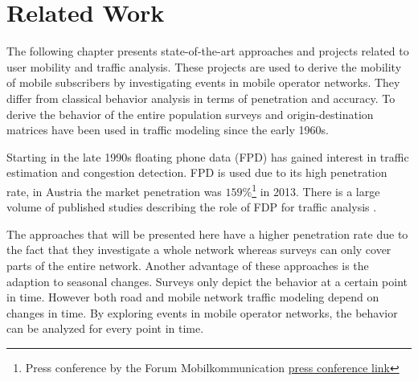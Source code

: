 \chapter{Related Work}
The following chapter presents state-of-the-art approaches and projects related to user mobility and traffic analysis. These projects are used to derive the mobility of mobile subscribers by investigating events in mobile operator networks. They differ from classical behavior analysis in terms of penetration and accuracy. To derive the behavior of the entire population surveys and origin-destination matrices have been used in traffic modeling since the early 1960s.

Starting in the late 1990s floating phone data (FPD) has gained interest in traffic estimation and congestion detection. FPD is used due to its high penetration rate, in Austria the market penetration was $159\%$\footnote{Press conference by the Forum Mobilkommunication \href{http://www.fmk.at/Medien/Pressekonferenzen/FMK-Jahrespressekonferenz-2012}{press conference link}} in 2013. There is a large volume of published studies describing the role of FDP for traffic analysis \cite{Yim2001,Qiu2007,Caceres2008}.

The approaches that will be presented here have a higher penetration rate due to the fact that they investigate a whole network whereas surveys can only cover parts of the entire network. Another advantage of these approaches is the adaption to seasonal changes. Surveys only depict the behavior at a certain point in time. However both road and mobile network traffic modeling depend on changes in time. By exploring events in mobile operator networks, the behavior can be analyzed for every point in time.

